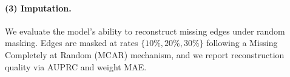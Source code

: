 \paragraph{(3) Imputation.}
We evaluate the model's ability to reconstruct missing edges under random masking. Edges are masked at rates $\{10\%, 20\%, 30\%\}$ following a Missing Completely at Random (MCAR) mechanism, and we report reconstruction quality via AUPRC and weight MAE.

